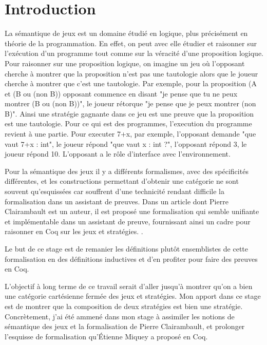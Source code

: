 \documentclass[a4paper,12pt]{article}
\title{\letitle}
\author{\leauthor}
\date{}
\begin{document}
\maketitle

\newpage

\section{Introduction}

La sémantique de jeux est un domaine étudié en logique, plus précisément en
théorie de la programmation.
En effet, on peut avec elle étudier et raisonner sur l'exécution d'un programme
tout comme sur la véracité d'une proposition logique.
Pour raisonner sur une proposition logique, on imagine un jeu où l'opposant
cherche à montrer que la proposition n'est pas une tautologie alors que le joueur
cherche à montrer que c'est une tautologie. Par exemple, pour la proposition
(A et (B ou (non B)) opposant commence en disant "je pense que tu ne peux montrer
(B ou (non B))", le joueur rétorque "je pense que je peux montrer (non B)". Ainsi
une stratégie gagnante dans ce jeu est une preuve que la proposition est une
tautologie.
Pour ce qui est des programmes, l'execution du programme revient à une partie.
Pour executer 7+x, par exemple, l'opposant demande "que vaut 7+x : int",
le joueur répond "que vaut x : int ?", l'opposant répond 3, le joueur répond 10.
L'opposant a le rôle d'interface avec l'environnement.

Pour la sémantique des jeux il y a différents formalismes, avec des spécificités
différentes, et les constructions permettant d'obtenir une catégorie ne sont
souvent qu'esquissées car souffrent d'une technicité rendant difficile
la formalisation dans un assistant de preuves.
Dans un article dont Pierre Clairambault est un auteur, il est proposé une
formalisation qui semble unifiante et implémentable dans un assistant de preuve,
fournissant ainsi un cadre pour raisonner en Coq sur les jeux et stratégies.
\cite{game}.

Le but de ce stage est de remanier les définitions plutôt ensemblistes de cette
formalisation en des définitions inductives et d'en profiter pour faire des
preuves en Coq.

L'objectif à long terme de ce travail serait d'aller jusqu'à montrer qu'on a bien
une catégorie cartésienne fermée des jeux et stratégies. Mon apport dans ce stage
est de montrer que la composition de deux stratégies est bien une
stratégie.
Concrètement, j'ai été ammené dans mon stage à assimiler les notions de sémantique
des jeux et la formalisation de Pierre Clairambault, et prolonger l'esquisse de
formalisation qu'Étienne Miquey a proposé en Coq.
\end{document}
